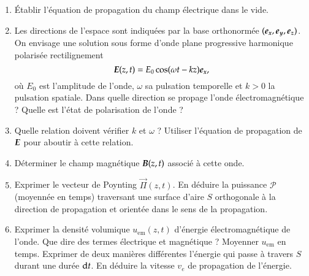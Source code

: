 \begin{exocor}
	\begin{enumerate}
		\item Établir l'équation de propagation du champ électrique dans 
		  le vide.
		\item Les directions de l'espace sont indiquées par la base 
		  orthonormée $(\ex, \ey, \ez)$. On envisage une solution sous 
		  forme d'onde plane progressive harmonique polarisée rectilignement
		  \begin{equation*}
			  \vece(z, t) = E_0 \cos(\omega t - k z)\ex,
		  \end{equation*}
		  où $E_0$ est l'amplitude de l'onde, $\omega$ sa pulsation temporelle
		  et $k > 0$ la pulsation spatiale. Dans quelle direction se propage
		  l'onde électromagnétique ? Quelle est l'état de polarisation 
		  de l'onde ?
	  	\item Quelle relation doivent vérifier $k$ et $\omega$ ? Utiliser
		  l'équation de propagation de $\vece$ pour aboutir à cette relation.
	  \item Déterminer le champ magnétique $\vecb(z, t)$ associé à cette onde.
	  \item Exprimer le vecteur de Poynting $\vec{\Pi}(z, t)$. 
		  En déduire la puissance 
		  $\mathcal{P}$ (moyennée en temps) traversant une surface d'aire
		  $S$ orthogonale à la direction de propagation et orientée
		  dans le sens de la propagation.
	  \item Exprimer la densité volumique $u_\mathrm{em}(z, t)$ d'énergie 
		  électromagnétique de l'onde. Que dire des termes électrique
		  et magnétique ? Moyenner $u_\mathrm{em}$ en temps. 
		\itm Exprimer de deux manières différentes l'énergie qui passe 
		  à travers $S$ durant une durée $\mathrm{d}t$. En déduire
		  la vitesse $v_e$ de propagation de l'énergie.
	\end{enumerate}
\end{exocor}


